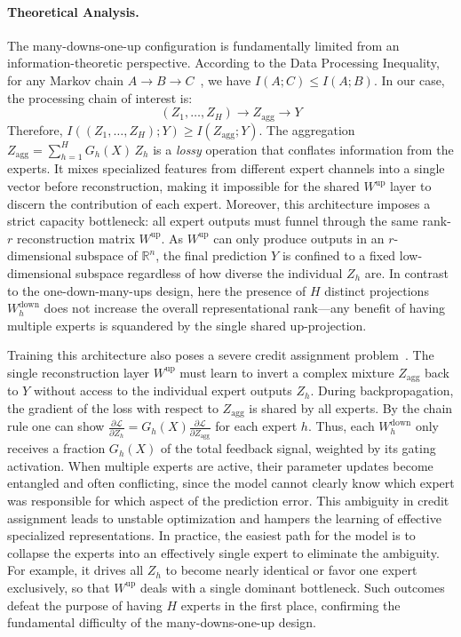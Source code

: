 \documentclass{article} %
\begin{document}
\paragraph{Theoretical Analysis.}
The many-downs-one-up configuration is fundamentally limited from an information-theoretic perspective. According to the Data Processing Inequality, for any Markov chain $A \to B \to C$~\citep{norris1998markov}, we have $I(A; C) \le I(A; B)$. In our case, the processing chain of interest is:
\begin{equation}
    (Z_1, \dots, Z_H) \to Z_{\text{agg}} \to Y
\end{equation}
Therefore, $I((Z_1, \dots, Z_H); Y) \ge I(Z_{\text{agg}}; Y)$. The aggregation $Z_{\text{agg}} = \sum_{h=1}^H G_h(X)\, Z_h$ is a \emph{lossy} operation that conflates information from the experts. It mixes specialized features from different expert channels into a single vector before reconstruction, making it impossible for the shared $W^{\text{up}}$ layer to discern the contribution of each expert. Moreover, this architecture imposes a strict capacity bottleneck: all expert outputs must funnel through the same rank-$r$ reconstruction matrix $W^{\text{up}}$. As $W^{\text{up}}$ can only produce outputs in an $r$-dimensional subspace of $\mathbb{R}^n$, the final prediction $Y$ is confined to a fixed low-dimensional subspace regardless of how diverse the individual $Z_h$ are. In contrast to the one-down-many-ups design, here the presence of $H$ distinct projections $W^{\text{down}}_h$ does not increase the overall representational rank—any benefit of having multiple experts is squandered by the single shared up-projection.

Training this architecture also poses a severe credit assignment problem~\citep{fedus2022switch,zhang2025more}. The single reconstruction layer $W^{\text{up}}$ must learn to invert a complex mixture $Z_{\text{agg}}$ back to $Y$ without access to the individual expert outputs $Z_h$. During backpropagation, the gradient of the loss with respect to $Z_{\text{agg}}$ is shared by all experts. By the chain rule one can show $\frac{\partial \mathcal{L}}{\partial Z_h} = G_h(X) \frac{\partial \mathcal{L}}{\partial Z_{\text{agg}}}$ for each expert $h$. Thus, each $W^{\text{down}}_h$ only receives a fraction $G_h(X)$ of the total feedback signal, weighted by its gating activation. When multiple experts are active, their parameter updates become entangled and often conflicting, since the model cannot clearly know which expert was responsible for which aspect of the prediction error. This ambiguity in credit assignment leads to unstable optimization and hampers the learning of effective specialized representations. In practice, the easiest path for the model is to collapse the experts into an effectively single expert to eliminate the ambiguity. For example, it drives all $Z_h$ to become nearly identical or favor one expert exclusively, so that $W^{\text{up}}$ deals with a single dominant bottleneck. Such outcomes defeat the purpose of having $H$ experts in the first place, confirming the fundamental difficulty of the many-downs-one-up design.
\end{document}
